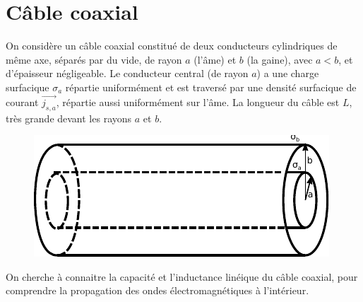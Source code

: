\documentclass{report}
\begin{document}
\newpage

\section*{Câble coaxial}

On considère un câble coaxial constitué de deux conducteurs cylindriques de même axe, séparés par du vide, de rayon $a$ (l'âme) et $b$ (la gaine), avec $a<b$, et d'épaisseur négligeable. Le conducteur central (de rayon $a$) a une charge surfacique $\sigma_a$ répartie uniformément et est traversé par une densité surfacique de courant $\vec{j_{s,a}}$, répartie aussi uniformément sur l'âme. La longueur du câble est $L$, très grande devant les rayons $a$ et $b$.  

\begin{figure}[h!]
\centering
		\includegraphics[scale=1]{em2.pdf}
\end{figure}

On cherche à connaitre la capacité et l'inductance linéique du câble coaxial, pour comprendre la propagation des ondes électromagnétiques à l'intérieur. 
\end{document}
